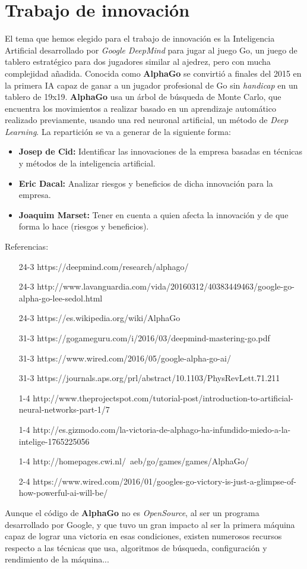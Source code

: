 \documentclass{article}
\begin{document}
\section{Trabajo de innovación}
 El tema que hemos elegido para el trabajo de innovación es la Inteligencia Artificial desarrollado por \textit{Google DeepMind} para jugar al juego Go,  un juego de tablero estratégico para dos jugadores similar al ajedrez, pero con mucha complejidad añadida. Conocida como \textbf{AlphaGo} se convirtió a finales del 2015 en la primera IA capaz de ganar a un jugador profesional de Go sin \textit{handicap} en un tablero de 19x19. \textbf{AlphaGo} usa un árbol de búsqueda de Monte Carlo, que encuentra los movimientos a realizar basado en un aprendizaje automático realizado previamente, usando una red neuronal artificial, un método de \textit{Deep Learning}.
  La repartición se va a generar de la siguiente forma:
 \begin{itemize}
     \item \textbf{Josep de Cid:} Identificar las innovaciones de la empresa basadas en técnicas y métodos de la inteligencia artificial.
     \item \textbf{Eric Dacal:} Analizar riesgos y beneficios de dicha innovación para la empresa.
     \item \textbf{Joaquim Marset:} Tener en cuenta a quien afecta la innovación y de que forma lo hace (riesgos y beneficios).
 \end{itemize}
 Referencias:
 \begin{itemize}
     \item [24-3] https://deepmind.com/research/alphago/
     \item [24-3] http://www.lavanguardia.com/vida/20160312/40383449463/google-go-alpha-go-lee-sedol.html
     \item [24-3] https://es.wikipedia.org/wiki/AlphaGo
     \item [31-3] https://gogameguru.com/i/2016/03/deepmind-mastering-go.pdf
     \item [31-3] https://www.wired.com/2016/05/google-alpha-go-ai/
     \item [31-3] https://journals.aps.org/prl/abstract/10.1103/PhysRevLett.71.211
     \item [1-4] http://www.theprojectspot.com/tutorial-post/introduction-to-artificial-neural-networks-part-1/7
     \item [1-4] http://es.gizmodo.com/la-victoria-de-alphago-ha-infundido-miedo-a-la-intelige-1765225056
     \item [1-4]http://homepages.cwi.nl/~aeb/go/games/games/AlphaGo/
     \item [2-4] https://www.wired.com/2016/01/googles-go-victory-is-just-a-glimpse-of-how-powerful-ai-will-be/
 \end{itemize}
 Aunque el código de \textbf{AlphaGo} no es \textit{OpenSource}, al ser un programa desarrollado por Google, y que tuvo un gran impacto al ser la primera máquina capaz de lograr una victoria en esas condiciones, existen numerosos recursos respecto a las técnicas que usa, algoritmos de búsqueda, configuración y rendimiento de la máquina...
\end{document}
